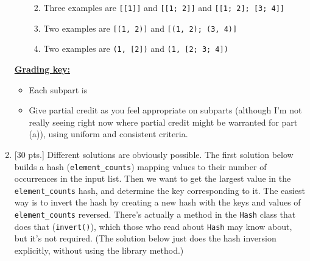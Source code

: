 \documentclass[11pt,fleqn]{article}
\begin{document}
\begin{enumerate}
\begin{enumerate}
\begin{enumerate}
                    \addtolength{\itemsep}{2mm}

                    \renewcommand{\labelenumiii}{\arabic{enumiii})}

                    \item Three examples are \texttt{[[1]]} and
                          \texttt{[[1; 2]]} and \texttt{[[1; 2]; [3; 4]]}

                    \item Two examples are \texttt{[(1, 2)]} and
                          \texttt{[(1, 2); (3, 4)]}

                    \item Two examples are \texttt{(1, [2])} and
                          \texttt{(1, [2; 3; 4])}

                  \end{enumerate}

          \end{enumerate}

          \begin{info}{\textbf{\underline{Grading key:}}}

            \smallskip

            \begin{itemize}

              \addtolength{\itemsep}{2mm}

              \item Each subpart is 

              \item Give partial credit as you feel appropriate on
                    subparts (although I'm not really seeing right now where
                    partial credit might be warranted for part (a)), using
                    uniform and consistent criteria.

            \end{itemize}

          \end{info}


    \item {[30 pts.]} Different solutions are obviously possible.  The first
          solution below builds a hash (\texttt{element\_counts}) mapping values
          to their number of occurrences in the input list.  Then we want to
          get the largest value in the \texttt{element\_counts} hash, and
          determine the key corresponding to it.  The easiest way is to
          invert the hash by creating a new hash with the keys and values of
          \texttt{element\_counts} reversed.  There's actually a method in
          the \texttt{Hash} class that does that (\texttt{invert()}), which
          those who read about \texttt{Hash} may know about, but it's not
          required.  (The solution below just does the hash inversion
          explicitly, without using the library method.)


\end{enumerate}
\end{document}

